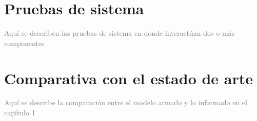\section{Pruebas de sistema}
\label{sec:Pruebas de sistema}

\textcolor{gray} {Aquí se describen las pruebas de sistema en donde interactúan dos o más componentes}


\section{Comparativa con el estado de arte}
\label{sec:Comparativa con el estado de arte}

\textcolor{gray} {Aquí se describe la comparación entre el modelo armado y lo informado en el capítulo 1}